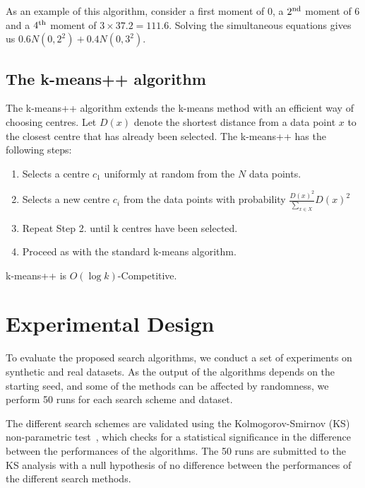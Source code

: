 \documentclass{elsarticle}
\begin{document}
%
As an
example of this algorithm, consider a first moment of $0$, a $2^{\rm nd}$ moment of $6$ and a $4^{\rm th}$ moment of $3 \times 37.2 = 111.6$.
Solving the simultaneous equations gives us $0.6 N(0, 2^2) +  0.4 N(0, 3^2)$.

\subsection{The k-means++ algorithm}

The k-means++ algorithm extends the k-means method with an efficient way of choosing centres. Let $D(x)$ denote the shortest distance from a data point $x$ to the closest centre that has already been selected. The k-means++ has the following steps:

\begin{enumerate}
    \item Selects a centre $c_1$ uniformly at random from the $N$ data points.
    \item Selects a new centre $c_i$ from the data points with probability $\frac{D(x)^2}{\sum_{x\in X}}D(x)^2$
    \item Repeat Step 2. until k centres have been selected.
    \item Proceed as with the standard k-means algorithm.
\end{enumerate}

k-means++ is $O(\log k)$-Competitive.

\section{Experimental Design}

To evaluate the proposed search algorithms, we conduct a set of experiments on synthetic and real datasets. As the output of the algorithms depends on the starting seed, and some of the methods can be affected by randomness, we perform 50 runs for each search scheme and dataset. 

The different search schemes are validated using the Kolmogorov-Smirnov (KS) non-parametric test~\citep{Pettitt77S}, which checks for a statistical significance in the difference between the performances of the algorithms. The 50 runs are submitted to the KS analysis with a null hypothesis of no difference between the performances of the different search methods.  
\end{document}
